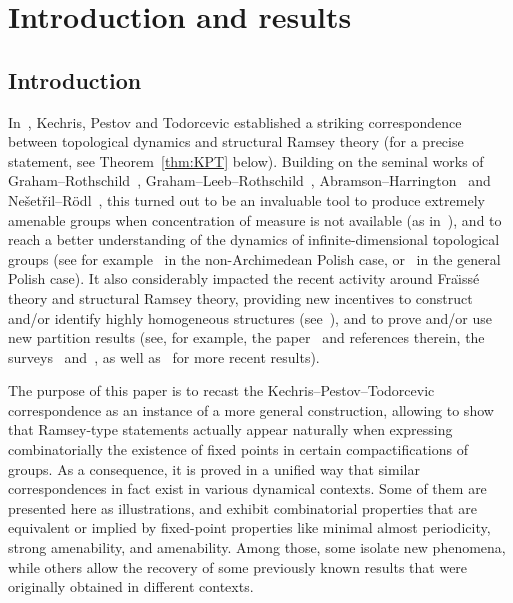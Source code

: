 \section{Introduction and results}
\label{section:Intro}

\subsection{Introduction}

In~\cite{KPT}, Kechris, Pestov and Todorcevic established a striking correspondence between topological dynamics and structural Ramsey theory (for a precise statement, see Theorem~\ref{thm:KPT} below). Building on the seminal works of Graham--Rothschild~\cite{GR}, Graham--Leeb--Rothschild~\cite{GLR1, GLR2}, Abramson--\linebreak Harrington~\cite{AH} and Ne\v set\v ril--R\"odl~\cite{NR1,NR2}, this turned out to be an invaluable tool to produce extremely amenable groups when concentration of measure is not available (as in~\cite{GM,Gl1, GP}), and to reach a better understanding of the dynamics of infinite-dimensional topological groups (see for example~\cite{AKL, Z1} in the non-Archimedean Polish case, or~\cite{MT, MNT, BYMT} in the general Polish case). It also considerably impacted the recent activity around Fra\"{\i}ss\'e theory and structural Ramsey theory, providing new incentives to construct and/or identify highly homogeneous structures (see~\cite{KuS, Ku, EFHKKL}), and to prove and/or use new partition results (see, for example, the paper~\cite{Sol6} and references therein, the surveys~\cite{Bod2} and~\cite{NVT6}, as well as~\cite{BaK2, BaK3, BLLM, HN, PS} for more recent results).

The purpose of this paper is to recast the Kechris--Pestov--Todorcevic correspondence as an instance of a more general construction, allowing to show that Ramsey-type statements actually appear naturally when expressing combinatorially the \hbox{existence} of fixed points in certain compactifications of groups. As a consequence, it is proved in a unified way that similar correspondences in fact exist in various dynamical contexts. Some of them are presented here as illustrations, and exhibit combinatorial properties that are equivalent or implied by fixed-point properties like minimal almost periodicity, strong amenability, and amenability. Among those, some isolate new phenomena, while others allow the recovery of some previously known results that were originally obtained in different contexts.

